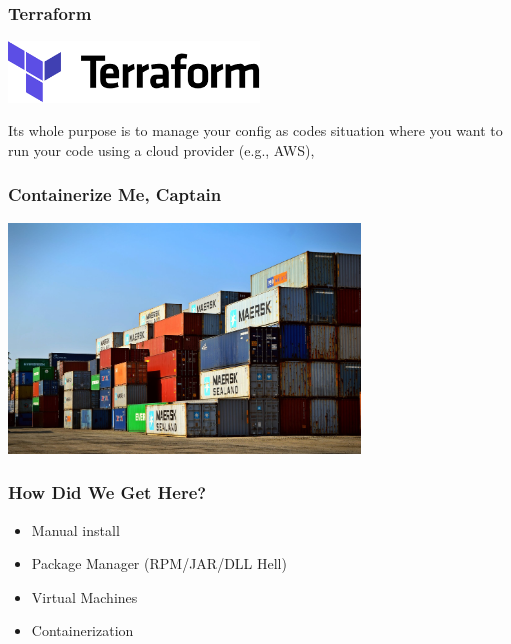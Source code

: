 \begin{frame}
\frametitle{Terraform}

\begin{center}
	\includegraphics[width=0.5\textwidth]{images/terraform.png}
\end{center}

Its whole purpose is to manage your config as codes
situation where you want to run your code using a cloud provider (e.g., AWS), 



\end{frame}



\begin{frame}
\frametitle{Containerize Me, Captain}

\begin{center}
	\includegraphics[width=0.7\textwidth]{images/container.jpeg}
\end{center}

\end{frame}


\begin{frame}
\frametitle{How Did We Get Here?}

\begin{itemize}
	\item Manual install
	\item Package Manager (RPM/JAR/DLL Hell)
	\item Virtual Machines
	\item Containerization
\end{itemize}


\end{frame}


